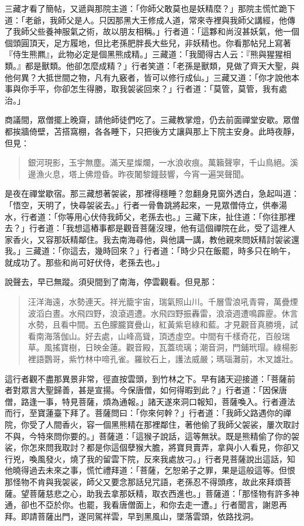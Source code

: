 三藏才看了簡帖，又遞與那院主道：「你師父敢莫也是妖精麼？」那院主慌忙跪下道：「老爺，我師父是人。只因那黑大王修成人道，常來寺裡與我師父講經，他傳了我師父些養神服氣之術，故以朋友相稱。」行者道：「這夥和尚沒甚妖氣，他一個個頭圓頂天，足方履地，但比老孫肥胖長大些兒，非妖精也。你看那帖兒上寫著『侍生熊羆』，此物必定是個黑熊成精。」三藏道：「我聞得古人云：『熊與猩猩相類。』都是獸類。他卻怎麼成精？」行者笑道：「老孫是獸類，見做了齊天大聖，與他何異？大抵世間之物，凡有九竅者，皆可以修行成仙。」三藏又道：「你才說他本事與你手平，你卻怎生得勝，取我袈裟回來？」行者道：「莫管，莫管，我有處治。」

商議間，眾僧擺上晚齋，請他師徒們吃了。三藏教掌燈，仍去前面禪堂安歇。眾僧都挨牆倚壁，苫搭窩棚，各各睡下，只把後方丈讓與那上下院主安身。此時夜靜，但見：
\begin{quote}
銀河現影，玉宇無塵。滿天星燦爛，一水浪收痕。萬籟聲寧，千山鳥絕。溪邊漁火息，塔上佛燈昏。昨夜闍黎鐘鼓響，今宵一遍哭聲聞。
\end{quote}

是夜在禪堂歇宿。那三藏想著袈裟，那裡得穩睡？忽翻身見窗外透白，急起叫道：「悟空，天明了，快尋袈裟去。」行者一骨魯跳將起來，一見眾僧侍立，供奉湯水，行者道：「你等用心伏侍我師父，老孫去也。」三藏下床，扯住道：「你往那裡去？」行者道：「我想這樁事都是觀音菩薩沒理，他有這個禪院在此，受了這裡人家香火，又容那妖精鄰住。我去南海尋他，與他講一講，教他親來問妖精討袈裟還我。」三藏道：「你這去，幾時回來？」行者道：「時少只在飯罷，時多只在晌午，就成功了。那些和尚可好伏侍，老孫去也。」

說聲去，早已無蹤。須臾間到了南海，停雲觀看。但見那：
\begin{quote}
汪洋海遠，水勢連天。祥光籠宇宙，瑞氣照山川。千層雪浪吼青霄，萬疊煙波滔白晝。水飛四野，浪滾週遭。水飛四野振轟雷，浪滾週遭鳴霹靂。休言水勢，且看中間。五色朦朧寶疊山，紅黃紫皂綠和藍。才見觀音真勝境，試看南海落伽山。好去處，山峰高聳，頂透虛空。中間有千樣奇花，百般瑞草。風搖寶樹，日映金蓮。觀音殿，瓦蓋琉璃；潮音洞，門鋪玳瑁。綠楊影裡語鸚哥，紫竹林中啼孔雀。羅紋石上，護法威嚴；瑪瑙灘前，木叉雄壯。
\end{quote}

這行者觀不盡那異景非常，徑直按雲頭，到竹林之下。早有諸天迎接道：「菩薩前者對眾言大聖歸善，甚是宣揚。今保唐僧，如何得暇到此？」行者道：「因保唐僧，路逢一事，特見菩薩，煩為通報。」諸天遂來洞口報知，菩薩喚入。行者遵法而行，至寶蓮臺下拜了。菩薩問曰：「你來何幹？」行者道：「我師父路遇你的禪院，你受了人間香火，容一個黑熊精在那裡鄰住，著他偷了我師父袈裟，屢次取討不與，今特來問你要的。」菩薩道：「這猴子說話，這等無狀。既是熊精偷了你的袈裟，你怎來問我取討？都是你這個孽猴大膽，將寶貝賣弄，拿與小人看見，你卻又行兇，喚風發火，燒了我的留雲下院，反來我處放刁。」行者見菩薩說出這話，知他曉得過去未來之事，慌忙禮拜道：「菩薩，乞恕弟子之罪，果是這般這等。但恨那怪物不肯與我袈裟，師父又要念那話兒咒語，老孫忍不得頭疼，故此來拜煩菩薩。望菩薩慈悲之心，助我去拿那妖精，取衣西進也。」菩薩道：「那怪物有許多神通，卻也不亞於你。也罷，我看唐僧面上，和你去走一遭。」行者聞言，謝恩再拜。即請菩薩出門，遂同駕祥雲，早到黑風山，墜落雲頭，依路找洞。


